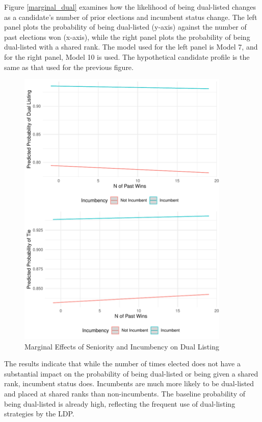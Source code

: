\documentclass[a4paper, 11pt]{article}
\begin{document}
Figure \ref{marginal_dual} examines how the likelihood of being dual-listed changes as a candidate’s number of prior elections and incumbent status change. The left panel plots the probability of being dual-listed (y-axis) against the number of past elections won (x-axis), while the right panel plots the probability of being dual-listed with a shared rank. The model used for the left panel is Model 7, and for the right panel, Model 10 is used. The hypothetical candidate profile is the same as that used for the previous figure.

\begin{figure}[!htbp]
	\includegraphics[width = 0.9\textwidth]{../figure/paper/marginal_effects_dual_tie.pdf}
	\caption{Marginal Effects of Seniority and Incumbency on Dual Listing}
	\label{fig:marginal_dual}
\end{figure}

The results indicate that while the number of times elected does not have a substantial impact on the probability of being dual-listed or being given a shared rank, incumbent status does. Incumbents are much more likely to be dual-listed and placed at shared ranks than non-incumbents. The baseline probability of being dual-listed is already high, reflecting the frequent use of dual-listing strategies by the LDP.
\end{document}
